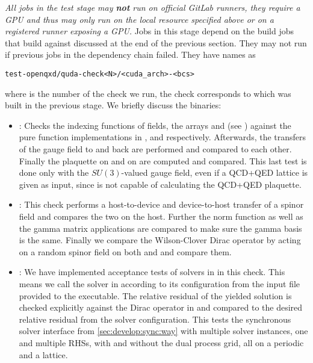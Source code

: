 \emph{All jobs in the test stage may \textbf{not} run on official GitLab runners, they require a GPU and thus may only run on the local resource specified above or on a registered runner exposing a GPU.}
Jobs in this stage depend on the build jobs that build \openqxd against \quda discussed at the end of the previous section.
They may not run if previous jobs in the dependency chain failed.
They have names as
\begin{verbatim}
test-openqxd/quda-check<N>/<cuda_arch>-<bcs>
\end{verbatim}
where  is the number of the check we run, \ie the check corresponds to  which was built in the previous stage.
We briefly discuss the binaries:
\begin{itemize}
  \item {}: Checks the indexing functions of fields, \ie the arrays  and  (see ) against the pure function implementations in \quda,  and  respectively. Afterwards, the transfers of the gauge field to \quda and back are performed and compared to each other. Finally the plaquette on \quda and on \openqxd are computed and compared. This last test is done only with the $SU(3)$-valued gauge field, even if a QCD+QED lattice is given as input, since \quda is not capable of calculating the QCD+QED plaquette.
  \item {}: This check performs a host-to-device and device-to-host transfer of a spinor field and compares the two on the host. Further the norm function as well as the gamma matrix applications are compared to make sure the gamma basis is the same. Finally we compare the Wilson-Clover Dirac operator by acting on a random spinor field on both \openqxd and \quda and compare them.
  \item {}: We have implemented acceptance tests of solvers in \quda in this check. This means we call the solver in \quda according to its configuration from the input file provided to the executable. The relative residual of the yielded solution is checked explicitly against the Dirac operator in \openqxd and compared to the desired relative residual from the solver configuration. This tests the synchronous solver interface from \cref{sec:develop:sync:way} with multiple solver instances, one and multiple RHSs, with and without the dual process grid, all on a periodic and a \Cstar lattice.

\end{itemize}
